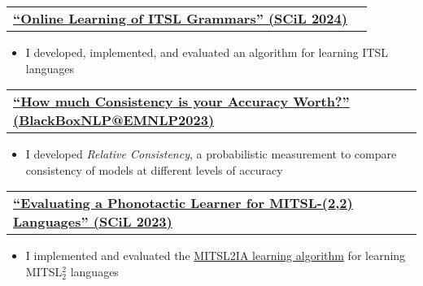 \documentclass[letterpaper,11pt]{article}
\makeatletter
\newcommand{\resumeItem}[1]{
  \item{
    {#1 \vspace{-4pt}}
  }
}
\newcommand{\resumeSubheading}[4]{
  \vspace{-5pt}\item
    \begin{tabular*}{0.97\textwidth}[t]{l@{\extracolsep{\fill}}r}
      \textbf{#1} & #2 \\
    \end{tabular*}\vspace{-10pt}
}
\newcommand{\resumeItemListStart}{\begin{itemize}}
\newcommand{\resumeItemListEnd}{\end{itemize}\vspace{-5pt}}
\makeatother
\begin{document}
    \resumeSubheading
    {\href{https://aclanthology.org/2024.scil-1.23/}{``Online Learning of ITSL Grammars'' (SCiL 2024)}}{}{}{}
        \resumeItemListStart\small
            \resumeItem{I developed, implemented, and evaluated an algorithm for learning ITSL languages}
        \resumeItemListEnd

    \resumeSubheading
        {\href{https://aclanthology.org/2023.blackboxnlp-1.19/}{``How much Consistency is your Accuracy Worth?'' (BlackBoxNLP@EMNLP2023)}}{}{}{}
        \resumeItemListStart\small
            \resumeItem{I developed \textit{Relative Consistency}, a probabilistic measurement to compare consistency of models at different levels of accuracy}
        \resumeItemListEnd

    \resumeSubheading
        {\href{https://scholarworks.umass.edu/cgi/viewcontent.cgi?article=1268\&context=scil}{``Evaluating a Phonotactic Learner for MITSL-(2,2) Languages'' (SCiL 2023)}}{}{}{}
        \resumeItemListStart\small
            \resumeItem{I implemented and evaluated the \href{https://aclanthology.org/2021.scil-1.16.pdf}{MITSL2IA learning algorithm} for learning MITSL$_2^2$ languages}
        \resumeItemListEnd
\end{document}
